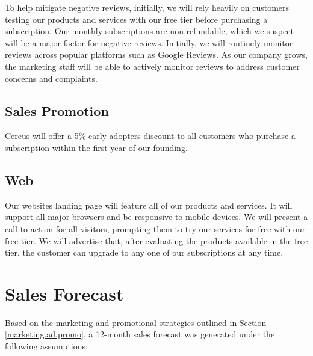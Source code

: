 To help mitigate negative reviews, initially, we will rely heavily on customers testing our products and services with our free tier before purchasing a subscription. Our monthly subscriptions are non-refundable, which we suspect will be a major factor for negative reviews. Initially, we will routinely monitor reviews across popular platforms such as Google Reviews. As our company grows, the marketing staff will be able to actively monitor reviews to address customer concerns and complaints.

\subsection{Sales Promotion}

Cereus will offer a 5\% early adopters discount to all customers who purchase a subscription within the first year of our founding.

\subsection{Web}

Our websites landing page will feature all of our products and services. It will support all major browsers and be responsive to mobile devices. We will present a call-to-action for all visitors, prompting them to try our services for free with our free tier. We will advertise that, after evaluating the products available in the free tier, the customer can upgrade to any one of our subscriptions at any time.
 

\section{Sales Forecast}

Based on the marketing and promotional strategies outlined in Section \ref{marketing.ad.promo}, a 12-month sales forecast was generated under the following assumptions:

